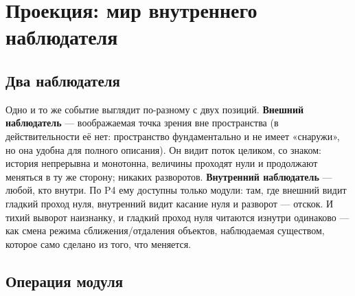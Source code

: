 \documentclass{article}
\begin{document}
\section{Проекция: мир внутреннего наблюдателя}

\subsection{Два наблюдателя}

Одно и то же событие выглядит по-разному с двух позиций. \textbf{Внешний наблюдатель} --- воображаемая точка зрения вне пространства (в действительности её нет: пространство фундаментально и не имеет «снаружи», но она удобна для полного описания). Он видит поток целиком, со знаком: история непрерывна и монотонна, величины проходят нули и продолжают меняться в ту же сторону; никаких разворотов. \textbf{Внутренний наблюдатель} --- любой, кто внутри. По P4 ему доступны только модули: там, где внешний видит гладкий проход нуля, внутренний видит касание нуля и разворот --- отскок. И тихий выворот наизнанку, и гладкий проход нуля читаются изнутри одинаково --- как смена режима сближения/отдаления объектов, наблюдаемая существом, которое само сделано из того, что меняется.

\subsection{Операция модуля}
\end{document}
